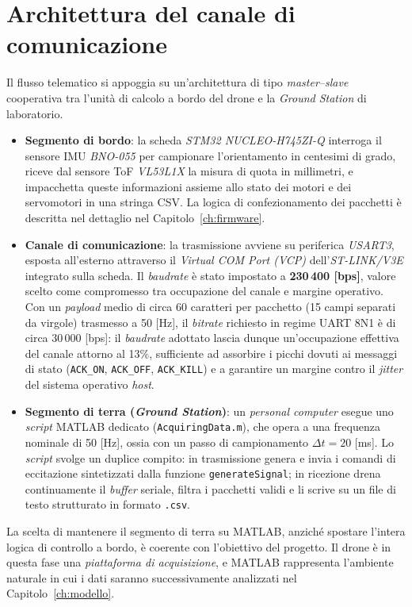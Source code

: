 \documentclass[11pt]{report}
\begin{document}
	\section{Architettura del canale di comunicazione}
	\label{sec:architettura_canale}
	
	Il flusso telematico si appoggia su un'architettura di tipo \textit{master--slave} cooperativa tra l'unità di calcolo a bordo del drone e la \textit{Ground Station} di laboratorio.
	\begin{itemize}
		\item \textbf{Segmento di bordo}: la scheda \textit{STM32 NUCLEO-H745ZI-Q} interroga il sensore IMU \textit{BNO-055} per campionare l'orientamento in centesimi di grado, riceve dal sensore ToF \textit{VL53L1X} la misura di quota in millimetri, e impacchetta queste informazioni assieme allo stato dei motori e dei servomotori in una stringa CSV. La logica di confezionamento dei pacchetti è descritta nel dettaglio nel Capitolo~\ref{ch:firmware}.
		\item \textbf{Canale di comunicazione}: la trasmissione avviene su periferica \textit{USART3}, esposta all'esterno attraverso il \textit{Virtual COM Port (VCP)} dell'\textit{ST-LINK/V3E} integrato sulla scheda. Il \textit{baudrate} è stato impostato a \textbf{230\,400 [bps]}, valore scelto come compromesso tra occupazione del canale e margine operativo. Con un \textit{payload} medio di circa 60 caratteri per pacchetto (15 campi separati da virgole) trasmesso a 50 [Hz], il \textit{bitrate} richiesto in regime UART 8N1 è di circa 30\,000 [bps]: il \textit{baudrate} adottato lascia dunque un'occupazione effettiva del canale attorno al 13\%, sufficiente ad assorbire i picchi dovuti ai messaggi di stato (\texttt{ACK\_ON}, \texttt{ACK\_OFF}, \texttt{ACK\_KILL}) e a garantire un margine contro il \textit{jitter} del sistema operativo \textit{host}.
		\item \textbf{Segmento di terra (\textit{Ground Station})}: un \textit{personal computer} esegue uno \textit{script} MATLAB dedicato (\texttt{AcquiringData.m}), che opera a una frequenza nominale di 50 [Hz], ossia con un passo di campionamento $\Delta t = 20$ [ms]. Lo \textit{script} svolge un duplice compito: in trasmissione genera e invia i comandi di eccitazione sintetizzati dalla funzione \texttt{generateSignal}; in ricezione drena continuamente il \textit{buffer} seriale, filtra i pacchetti validi e li scrive su un file di testo strutturato in formato \texttt{.csv}.
	\end{itemize}
	La scelta di mantenere il segmento di terra su MATLAB, anziché spostare l'intera logica di controllo a bordo, è coerente con l'obiettivo del progetto. Il drone è in questa fase una \textit{piattaforma di acquisizione}, e MATLAB rappresenta l'ambiente naturale in cui i dati saranno successivamente analizzati nel Capitolo~\ref{ch:modello}.
	
\end{document}
